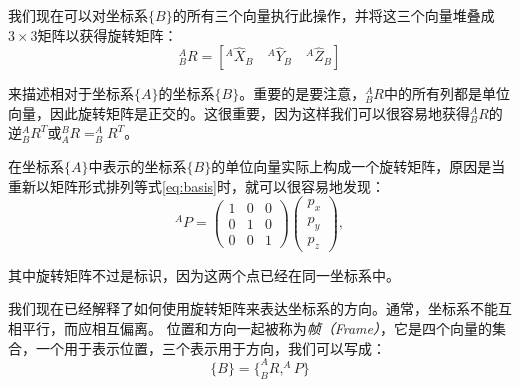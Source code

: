 我们现在可以对坐标系$\{B\}$的所有三个向量执行此操作，并将这三个向量堆叠成$3\times3$矩阵以获得旋转矩阵：
\begin{equation}
^A_BR=[^A\hat{X}_B \quad ^A\hat{Y}_B \quad ^A\hat{Z}_B]
\end{equation}
%

来描述相对于坐标系$\{A\}$的坐标系$\{B\}$。重要的是要注意，$^A_BR$中的所有列都是单位向量，因此旋转矩阵是正交的。这很重要，因为这样我们可以很容易地获得$^A_BR$的逆$^A_BR^T$或$^B_AR=^A_BR^T$。


在坐标系$\{A\}$中表示的坐标系$\{B\}$的单位向量实际上构成一个旋转矩阵，原因是当重新以矩阵形式排列等式\ref{eq:basis}时，就可以很容易地发现：
\begin{equation}
^AP=\left(\begin{array}{ccc}1 & 0 & 0\\0 & 1 & 0\\0 & 0 & 1\end{array}\right)\left(\begin{array}{c}p_x\\p_y\\p_z\end{array}\right),
\end{equation}


其中旋转矩阵不过是标识，因为这两个点已经在同一坐标系中。

%

我们现在已经解释了如何使用旋转矩阵来表达坐标系的方向。通常，坐标系不能互相平行，而应相互偏离。 位置和方向一起被称为\emph{帧（Frame）}，它是四个向量的集合，一个用于表示位置，三个表示用于方向，我们可以写成：
\begin{equation}
\{B\}=\{^A_BR, ^AP\}
\end{equation}
%

